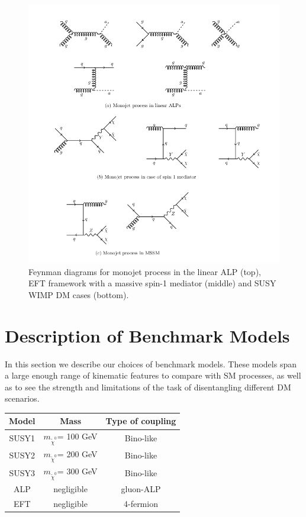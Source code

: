 \documentclass[prd,aps,letterpaper,floatfix,superscriptaddress,preprintnumbers,twocolumn,10pt,nofootinbib]{revtex4-1}
\begin{document}
\begin{figure} [t]
\includegraphics[scale=0.5]{figures/fyndiag.png}
\caption{Feynman diagrams for monojet process in the linear ALP (top), EFT framework with a massive spin-1 mediator (middle) and SUSY WIMP DM cases (bottom).\label{fyndiag}}
\end{figure}
\section{Description of Benchmark Models \label{sec:models}}
In this section we describe our choices of benchmark models. These models span a large enough range of kinematic features to compare with SM processes, as well as to see the strength and limitations of the task of disentangling different DM scenarios.

\vspace{.5cm}
\begin{center}
\begin{tabular}{ c | c | c }\label{tab:bench}  Model & Mass & Type of coupling \\
\hline     SUSY1  & $m_{\tilde\chi^0}$= 100 GeV & Bino-like  \\
     SUSY2 & $m_{\tilde\chi^0}$= 200 GeV & Bino-like\\
     SUSY3 & $m_{\tilde\chi^0}$= 300 GeV & Bino-like  \\ \hline 
     ALP & negligible &  gluon-ALP \\ \hline
     EFT & negligible & 4-fermion \\ \hline
     
\end{tabular}
\end{center}
\vspace{.5cm}
\end{document}
